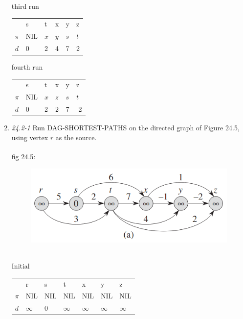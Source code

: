 \documentclass[]{memoir}
\begin{document}
\begin{enumerate}
third run
\begin{table}[h]
\begin{tabular}{l|l|l|l|l|l}
      & s        & t   & x   & y   & z   \\
$\pi$ & NIL      & $x$ & $y$ & $s$ & $t$ \\
$d$   & 0        & 2   & 4   & 7   & 2
\end{tabular}
\end{table}

fourth run
\begin{table}[h]
\begin{tabular}{l|l|l|l|l|l}
      & s        & t   & x   & y   & z   \\
$\pi$ & NIL      & $x$ & $z$ & $s$ & $t$ \\
$d$   & 0        & 2   & 2   & 7   & -2
\end{tabular}
\end{table}

\item \textit{24.2-1} Run DAG-SHORTEST-PATHS on the directed graph of Figure 24.5, using vertex $r$ as the source.
\paragraph{} fig 24.5:
\begin{figure}[h]
	\centering
	\includegraphics[scale=.7]{fig24-5}
\end{figure}
\pagebreak\\
Initial
\begin{table}[h]
\begin{tabular}{l|l|l|l|l|l|l}
      & r        & s        & t        & x        & y        & z   \\
$\pi$ & NIL      & NIL      & NIL      & NIL      & NIL      & NIL \\
$d$   & $\infty$ & 0        & $\infty$ & $\infty$ & $\infty$ & $\infty$
\end{tabular}
\end{table}


\end{enumerate}
\end{document}
